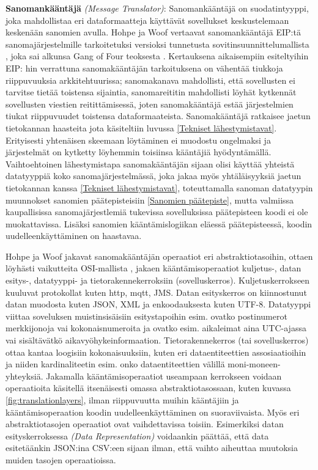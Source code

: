    \textbf{Sanomankääntäjä} \textit{(Message Translator)}:
      Sanomankääntäjä on suodatintyyppi, joka mahdollistaa eri dataformaatteja käyttävät sovellukset keskustelemaan keskenään sanomien avulla. Hohpe ja Woof vertaavat sanomankääntäjä EIP:tä sanomajärjestelmille tarkoitetuksi versioksi tunnetusta sovitinsuunnittelumallista \citep[sivu~97]{Hohpe2004}, joka sai alkunsa Gang of Four teoksesta \citep{Gamma1994}.
      Kertauksena aikaisempiin esiteltyihin EIP: hin verrattuna sanomakääntäjän tarkoituksena on vähentää tiukkoja riippuvuuksia arkkitehtuurissa; sanomakanava mahdollisti, että sovellusten ei tarvitse tietää toistensa sijaintia, sanomareititin mahdollisti löyhät kytkennät sovellusten viestien reitittämisessä, joten sanomakääntäjä estää järjestelmien tiukat riippuvuudet toistensa dataformaateista.
      Sanomakääntäjä ratkaisee jaetun tietokannan haasteita jota käsiteltiin luvussa \ref{Tekniset lähestymistavat}. Erityisesti yhtenäisen skeemaan löytäminen ei muodostu ongelmaksi ja järjestelmät on  kytketty löyhemmin toisiinsa kääntäjiä hyödyntämällä.
      Vaihtoehtoinen lähestymistapa sanomakääntäjän sijaan olisi käyttää yhteistä datatyyppiä koko sanomajärjestelmässä, joka jakaa myös yhtäläisyyksiä jaetun tietokannan kanssa \ref{Tekniset lähestymistavat}, toteuttamalla sanoman datatyypin muunnokset sanomien päätepisteisiin \ref{Sanomien päätepiste}, mutta valmiissa kaupallisissa sanomajärjestlemiä tukevissa sovelluksissa päätepisteen koodi ei ole muokattavissa. Lisäksi sanomien kääntämislogiikan eläessä päätepisteessä, koodin uudelleenkäyttäminen on haastavaa.

      Hohpe ja Woof \citep{Hohpe2004} jakavat sanomakääntäjän operaatiot eri abstraktiotasoihin, ottaen löyhästi vaikutteita OSI-mallista \citep{OSImodel}, jakaen kääntämisoperaatiot kuljetus-, datan esitys-, datatyyppi- ja tietorakennekerroksiin (sovelluskerros).
      Kuljetuskerrokseen kuuluvat protokollat kuten http, mqtt, JMS. Datan esityskerros on kiinnostunut datan muodosta kuten JSON, XML ja enkoodauksesta kuten UTF-8. Datatyyppi viittaa soveluksen muistinsisäisiin esitystapoihin esim. ovatko postinumerot merkkijonoja vai kokonaisnumeroita ja ovatko esim. aikaleimat aina UTC-ajassa vai sisältävätkö aikavyöhykeinformaation.
      Tietorakennekerros (tai sovelluskerros) ottaa kantaa loogisiin kokonaisuuksiin, kuten eri dataentiteettien assosiaatioihin ja niiden kardinaliteetin esim. onko dataentiteettien välillä moni-moneen-yhteyksiä.
      Jakamalla kääntämisoperaatiot useampaan kerrokseen voidaan operaatioita käsitellä itsenäisesti omassa abstraktiotasossaan, kuten kuvassa \ref{fig:translationlayers}, ilman riippuvuutta muihin kääntäjiin ja kääntämisoperaation koodin uudelleenkäyttäminen on suoraviivaista. Myös eri abstraktiotasojen operaatiot ovat vaihdettavissa toisiin. Esimerkiksi datan esityskerroksessa \textit{(Data Representation)} voidaankin päättää, että data esitetäänkin JSON:ina CSV:een sijaan ilman, että vaihto aiheuttaa muutoksia muiden tasojen operaatioissa.

